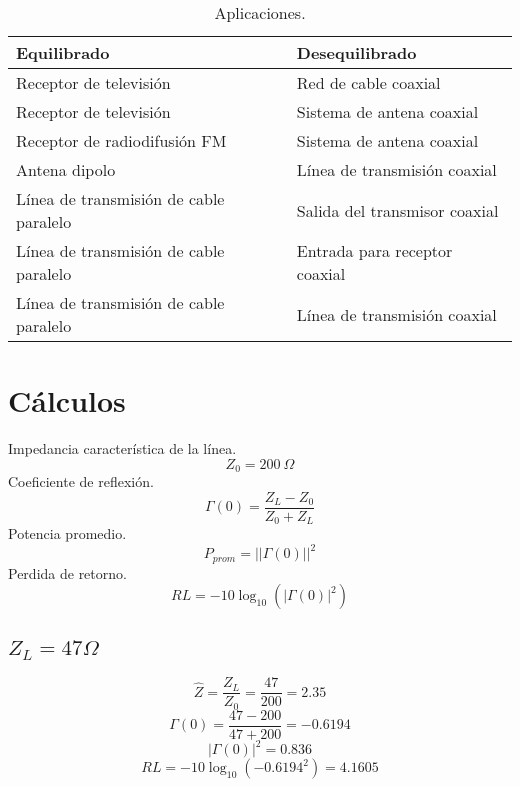 \documentclass[12pt,letterpaper]{article}
\begin{document}
\begin{table}[ht]
    \centering
    \begin{tabular}{|l|l|}
    \hline
    \textbf{Equilibrado} & \textbf{Desequilibrado} \\ \hline
    Receptor de televisión & Red de cable coaxial \\ \hline
    Receptor de televisión & Sistema de antena coaxial \\ \hline
    Receptor de radiodifusión FM & Sistema de antena coaxial \\ \hline
    Antena dipolo & Línea de transmisión coaxial \\ \hline
    Línea de transmisión de cable paralelo & Salida del transmisor coaxial \\ \hline
    Línea de transmisión de cable paralelo & Entrada para receptor coaxial \\ \hline
    Línea de transmisión de cable paralelo & Línea de transmisión coaxial \\ \hline
    \end{tabular}
    \caption{Aplicaciones.}
\end{table}

\section{Cálculos}
Impedancia característica de la línea.
\begin{equation}
    Z_0=200 \ \Omega
\end{equation}
Coeficiente de reflexión.
\begin{equation}
    \Gamma(0)=\frac{Z_L-Z_0}{Z_0+Z_L}
\end{equation}
Potencia promedio.
\begin{equation}
    P_{prom}=||\Gamma(0)||^{2}
\end{equation}
Perdida de retorno.
\begin{equation}
    RL=-10\log_{10} (|\Gamma(0)|^{2})
\end{equation}

\subsection{$Z_L=47 \Omega$}
\begin{equation}
    \hat{Z}=\frac{Z_L}{Z_0}=\frac{47}{200}=2.35
\end{equation}
\begin{equation}
    \Gamma(0)=\frac{47-200}{47+200}=-0.6194
\end{equation}
\begin{equation}
    |\Gamma(0)|^{2}=0.836
\end{equation}
\begin{equation}
    RL=-10\log_{10} (-0.6194^{2})=4.1605
\end{equation}
\end{document}
